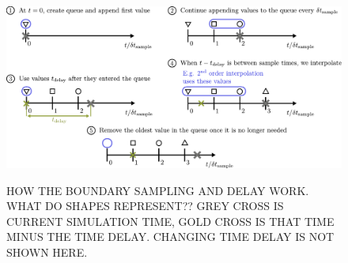 
\begin{figure}[t]
\centering
\includegraphics[scale=0.65]{assets/imgs/delay_bc_queue.pdf}
\label{fig:delay-queue}
\caption{HOW THE BOUNDARY SAMPLING AND DELAY WORK. WHAT DO SHAPES REPRESENT?? GREY CROSS IS CURRENT SIMULATION TIME, GOLD CROSS IS THAT TIME MINUS THE TIME DELAY. CHANGING TIME DELAY IS NOT SHOWN HERE.}
\end{figure}

